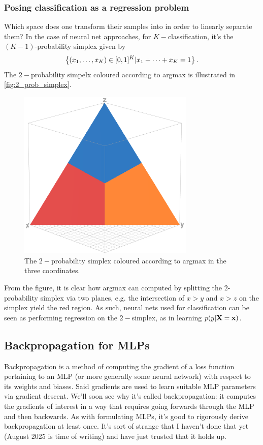 \documentclass[11pt]{article}
\begin{document}
\subsubsection{Posing classification as a regression problem}
Which space does one transform their samples into in order to linearly separate them? In the case of neural net approaches, for $K-$classification, it's the $(K-1)$-probability simplex given by
$$
\left\{(x_1,\dots,x_K)\in[0,1]^K|x_1+\dots+x_K=1\right\}.
$$
The $2-$probability simpelx coloured according to argmax is illustrated in \autoref{fig:2_prob_simplex}.
\begin{figure}[t]
    \centering
    \includegraphics[width=0.75\textwidth]{./figures/neural_nets/MLP_simplex_argmax.png}
    \caption{The $2-$probability simplex coloured according to argmax in the three coordinates.}
    \label{fig:2_prob_simplex}
\end{figure}
From the figure, it is clear how argmax can computed by splitting the $2$-probability simplex via two planes, e.g. the intersection of $x>y$ and $x>z$ on the simplex yield the red region. As such, neural nets used for classification can be seen as performing regression on the $2-$simplex, as in learning $p(y|\mathbf{X}=\mathbf{x})$.

\subsection{Backpropagation for MLPs}
\label{subsec:backprop}

Backpropagation is a method of computing the gradient of a loss function pertaining to an MLP (or more generally some neural network) with respect to its weights and biases. Said gradients are used to learn suitable MLP parameters via gradient descent. We'll soon see why it's called backpropagation: it computes the gradients of interest in a way that requires going forwards through the MLP and then backwards. As with formulating MLPs, it's good to rigorously derive backpropagation at least once. It's sort of strange that I haven't done that yet (August 2025 is time of writing) and have just trusted that it holds up.
\end{document}
